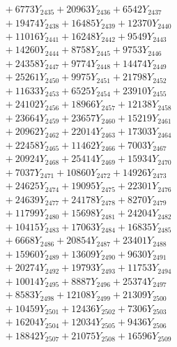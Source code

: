 \documentclass[a4paper,10pt]{article}
\begin{document}
{\begin{align}
&\;  + 6773 Y_{2435} + 20963 Y_{2436} + 6542 Y_{2437} \\[0.3ex]
&\;  + 19474 Y_{2438} + 16485 Y_{2439} + 12370 Y_{2440} \\[0.3ex]
&\;  + 11016 Y_{2441} + 16248 Y_{2442} + 9549 Y_{2443} \\[0.3ex]
&\;  + 14260 Y_{2444} + 8758 Y_{2445} + 9753 Y_{2446} \\[0.3ex]
&\;  + 24358 Y_{2447} + 9774 Y_{2448} + 14474 Y_{2449} \\[0.3ex]
&\;  + 25261 Y_{2450} + 9975 Y_{2451} + 21798 Y_{2452} \\[0.3ex]
&\;  + 11633 Y_{2453} + 6525 Y_{2454} + 23910 Y_{2455} \\[0.3ex]
&\;  + 24102 Y_{2456} + 18966 Y_{2457} + 12138 Y_{2458} \\[0.5ex]\allowbreak
&\;  + 23664 Y_{2459} + 23657 Y_{2460} + 15219 Y_{2461} \\[0.3ex]
&\;  + 20962 Y_{2462} + 22014 Y_{2463} + 17303 Y_{2464} \\[0.3ex]
&\;  + 22458 Y_{2465} + 11462 Y_{2466} + 7003 Y_{2467} \\[0.3ex]
&\;  + 20924 Y_{2468} + 25414 Y_{2469} + 15934 Y_{2470} \\[0.3ex]
&\;  + 7037 Y_{2471} + 10860 Y_{2472} + 14926 Y_{2473} \\[0.3ex]
&\;  + 24625 Y_{2474} + 19095 Y_{2475} + 22301 Y_{2476} \\[0.3ex]
&\;  + 24639 Y_{2477} + 24178 Y_{2478} + 8270 Y_{2479} \\[0.3ex]
&\;  + 11799 Y_{2480} + 15698 Y_{2481} + 24204 Y_{2482} \\[0.3ex]
&\;  + 10415 Y_{2483} + 17063 Y_{2484} + 16835 Y_{2485} \\[0.3ex]
&\;  + 6668 Y_{2486} + 20854 Y_{2487} + 23401 Y_{2488} \\[0.5ex]\allowbreak
&\;  + 15960 Y_{2489} + 13609 Y_{2490} + 9630 Y_{2491} \\[0.3ex]
&\;  + 20274 Y_{2492} + 19793 Y_{2493} + 11753 Y_{2494} \\[0.3ex]
&\;  + 10014 Y_{2495} + 8887 Y_{2496} + 25374 Y_{2497} \\[0.3ex]
&\;  + 8583 Y_{2498} + 12108 Y_{2499} + 21309 Y_{2500} \\[0.3ex]
&\;  + 10459 Y_{2501} + 12436 Y_{2502} + 7306 Y_{2503} \\[0.3ex]
&\;  + 16204 Y_{2504} + 12034 Y_{2505} + 9436 Y_{2506} \\[0.3ex]
&\;  + 18842 Y_{2507} + 21075 Y_{2508} + 16596 Y_{2509} \\[0.3ex]

\end{align}}
\end{document}
